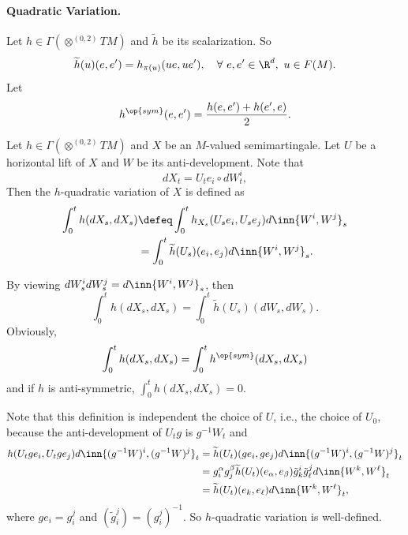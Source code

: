 \paragraph{Quadratic Variation.} Let $h \in \Gamma(\otimes^{(0,2)}TM)$ and $\widetilde{h}$ be its scalarization. So
\begin{equation*}
    \widetilde{h}(u)(e,e^\prime) = h_{\pi(u)}(ue,ue^\prime),\quad \forall~ e,e^\prime \in \R^d,~u\in F(M).
\end{equation*}
Let
\begin{equation*}
    h^{\op{sym}}(e,e^\prime) = \frac{h(e,e^\prime) + h(e^\prime,e)}{2}.
\end{equation*}

\begin{defn}
    Let $h \in \Gamma(\otimes^{(0,2)}TM)$ and $X$ be an $M$-valued semimartingale. Let $U$ be a horizontal lift of $X$ and $W$ be its anti-development. Note that
    \begin{equation*}
        dX_t = U_te_i \circ dW^i_t,
    \end{equation*}
    Then the $h$-quadratic variation of $X$ is defined as
    \begin{align*}
        \int_0^t h(dX_s,dX_s) &\defeq \int_0^t h_{X_s}(U_se_i,U_se_j) d\inn{W^i,W^j}_s\\
        &=\int_0^t \widetilde{h}(U_s)(e_i,e_j)d\inn{W^i,W^j}_s.
    \end{align*}
\end{defn}
By viewing $dW^i_sdW^j_s = d\inn{W^i,W^j}_s$, then
\begin{equation*}
    \int_0^t h(dX_s,dX_s) = \int_0^t \widetilde{h}(U_s)(dW_s,dW_s).
\end{equation*}
Obviously,
\begin{equation*}
    \int_0^t h(dX_s,dX_s) = \int_0^t h^{\op{sym}}(dX_s,dX_s)
\end{equation*}
and if $h$ is anti-symmetric, $\int_0^t h(dX_s,dX_s) = 0$.
\begin{rmk}
    Note that this definition is independent the choice of $U$, i.e., the choice of $U_0$, because the anti-development of $U_tg$ is $g^{-1}W_t$ and
    \begin{align*}
        h(U_tge_i,U_tge_j)d\inn{(g^{-1}W)^i,(g^{-1}W)^j}_t &= \widetilde{h}(U_t)(ge_i,ge_j) d\inn{(g^{-1}W)^i,(g^{-1}W)^j}_t\\
        &= g^{\alpha}_ig^{\beta}_j\widetilde{h}(U_t)(e_\alpha,e_\beta)\tilde{g}^i_k\tilde{g}^j_\ell d\inn{W^k,W^\ell}_t \\
        &=\widetilde{h}(U_t)(e_k,e_\ell) d\inn{W^k,W^\ell}_t,
    \end{align*}
    where $ge_i = g^j_i$ and $(\tilde{g}^j_i) = (g^j_i)^{-1}$. So $h$-quadratic variation is well-defined.
\end{rmk}


